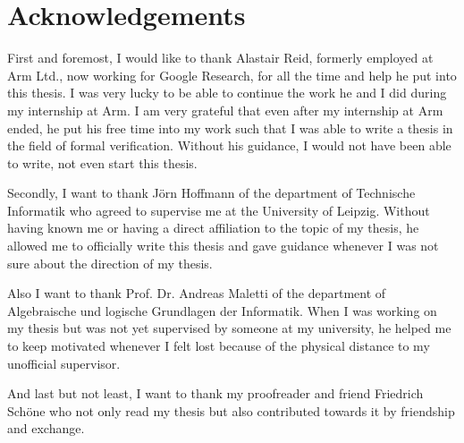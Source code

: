 \chapter*{\centering Acknowledgements}

First and foremost, I would like to thank Alastair Reid, formerly employed at Arm Ltd., now working for Google Research, for all the time and help he put into this thesis.
I was very lucky to be able to continue the work he and I did during my internship at Arm.
I am very grateful that even after my internship at Arm ended, he put his free time into my work such that I was able to write a thesis in the field of formal verification.
Without his guidance, I would not have been able to write, not even start this thesis.

Secondly, I want to thank Jörn Hoffmann of the department of Technische Informatik who agreed to supervise me at the University of Leipzig.
Without having known me or having a direct affiliation to the topic of my thesis, he allowed me to officially write this thesis and gave guidance whenever I was not sure about the direction of my thesis.

Also I want to thank Prof. Dr. Andreas Maletti of the department of Algebraische und logische Grundlagen der Informatik.
When I was working on my thesis but was not yet supervised by someone at my university, he helped me to keep motivated whenever I felt lost because of the physical distance to my unofficial supervisor.

And last but not least, I want to thank my proofreader and friend Friedrich Schöne who not only read my thesis but also contributed towards it by friendship and exchange.
